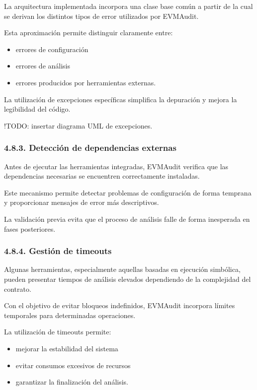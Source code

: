 La arquitectura implementada incorpora una clase base común a partir de
la cual se derivan los distintos tipos de error utilizados por EVMAudit.

Esta aproximación permite distinguir claramente entre:

\begin{itemize}
\tightlist
\item
  errores de configuración
\item
  errores de análisis
\item
  errores producidos por herramientas externas.
\end{itemize}

La utilización de excepciones específicas simplifica la depuración y
mejora la legibilidad del código.

!TODO: insertar diagrama UML de excepciones.

\subsubsection{4.8.3. Detección de dependencias
externas}\label{detecciuxf3n-de-dependencias-externas}

Antes de ejecutar las herramientas integradas, EVMAudit verifica que las
dependencias necesarias se encuentren correctamente instaladas.

Este mecanismo permite detectar problemas de configuración de forma
temprana y proporcionar mensajes de error más descriptivos.

La validación previa evita que el proceso de análisis falle de forma
inesperada en fases posteriores.

\subsubsection{4.8.4. Gestión de timeouts}\label{gestiuxf3n-de-timeouts}

Algunas herramientas, especialmente aquellas basadas en ejecución
simbólica, pueden presentar tiempos de análisis elevados dependiendo de
la complejidad del contrato.

Con el objetivo de evitar bloqueos indefinidos, EVMAudit incorpora
límites temporales para determinadas operaciones.

La utilización de timeouts permite:

\begin{itemize}
\tightlist
\item
  mejorar la estabilidad del sistema
\item
  evitar consumos excesivos de recursos
\item
  garantizar la finalización del análisis.
\end{itemize}

